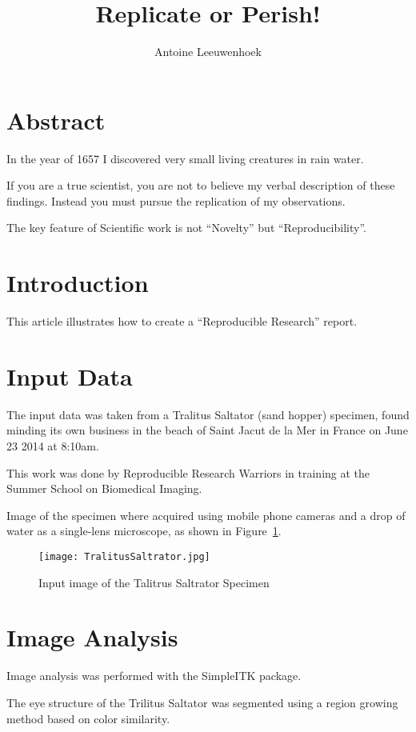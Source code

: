 \documentclass{article}
\title{Replicate or Perish!}
\author{Antoine Leeuwenhoek}
\begin{document}
\maketitle

\section{Abstract}

In the year of 1657 I discovered very small living creatures in rain water.

If you are a true scientist, you are not to believe my verbal description of these
findings. Instead you must pursue the replication of my observations.

The key feature of Scientific work is not ``Novelty'' but ``Reproducibility''.

\section{Introduction}

This article illustrates how to create a ``Reproducible Research'' report.

\section{Input Data}

The input data was taken from a Tralitus Saltator (sand hopper) specimen, found
minding its own business in the beach of Saint Jacut de la Mer in France on
June 23 2014 at 8:10am.

This work was done by Reproducible Research Warriors in training at the Summer
School on Biomedical Imaging.

Image of the specimen where acquired using mobile phone cameras and a drop of
water as a single-lens microscope, as shown in Figure~\ref{inputimage}.

\begin{figure}
\centering
\texttt{[image: TralitusSaltrator.jpg]}
\caption{Input image of the Talitrus Saltrator Specimen}
\label{inputimage}
\end{figure}

\section{Image Analysis}

Image analysis was performed with the SimpleITK package.

The eye structure of the Trilitus Saltator was segmented using a region growing
method based on color similarity.
\end{document}
